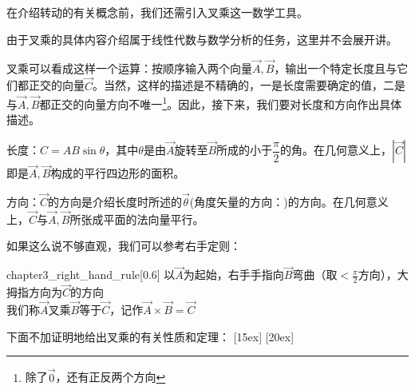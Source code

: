 	
\subsection[叉乘]{}
在介绍转动的有关概念前，我们还需引入叉乘这一数学工具。

由于叉乘的具体内容介绍属于线性代数与数学分析的任务，这里并不会展开讲。

叉乘可以看成这样一个运算：按顺序输入两个向量$\vec{A},\vec{B}$，输出一个特定长度且与它们都正交的向量$\vec{C}$。当然，这样的描述是不精确的，一是长度需要确定的值，二是与$\vec{A},\vec{B}$都正交的向量方向不唯一\footnote{除了$\vec{0}$，还有正反两个方向}。因此，接下来，我们要对长度和方向作出具体描述。

\begin{Itemize}
	\item 长度：$C=AB\sin\theta$，其中$\theta$是由$\vec{A}$旋转至$\vec{B}$所成的小于$\dfrac{\pi}{2}$的角\footnotemark 。在几何意义上，$|\vec{C}|$即是$\vec{A},\vec{B}$构成的平行四边形的面积。
	\item 方向：$\vec{C}$的方向是介绍长度时所述的$\vec{\theta}$(角度矢量的方向：)的方向。在几何意义上，$\vec{C}$与$\vec{A},\vec{B}$所张成平面的法向量平行。
\end{Itemize}

如果这么说不够直观，我们可以参考右手定则：

\begin{singlefigure}{chapter3_right_hand_rule}[0.6]
	以$\vec{A}$为起始，右手手指向$\vec{B}$弯曲（取$<\frac{\pi}{2}$方向），大拇指方向为$\vec{C}$的方向\\
	我们称$\vec{A}$叉乘$\vec{B}$等于$\vec{C}$，记作$\vec{A}\times\vec{B}=\vec{C}$
\end{singlefigure}

下面不加证明地给出叉乘的有关性质和定理：
[15ex]
[20ex]


